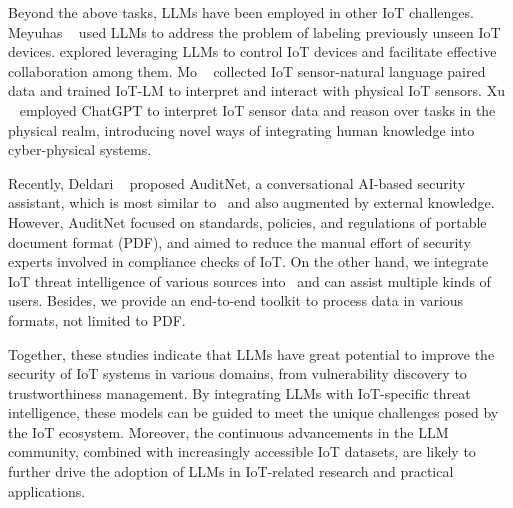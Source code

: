 Beyond the above tasks, LLMs have been employed in other IoT challenges.
Meyuhas \etal~\cite{meyuhas2024iotlabel} used LLMs to address the problem of labeling previously unseen IoT devices.
\cite{llmiotcontrol,cui2024llmind} explored leveraging LLMs to control IoT devices and facilitate effective collaboration among them.
Mo \etal~\cite{mo2024iot} collected IoT sensor-natural language paired data and trained IoT-LM to interpret and interact with physical IoT sensors.
Xu \etal~\cite{xu2024penetrative} employed ChatGPT to interpret IoT sensor data and reason over tasks in the physical realm, introducing novel ways of integrating human knowledge into cyber-physical systems. 

Recently, Deldari \etal~\cite{deldari2024auditnet} proposed AuditNet, a conversational AI-based security assistant, which is most similar to \chatiot\ and also augmented by external knowledge.
However, AuditNet focused on standards, policies, and regulations of portable document format (PDF), and aimed to reduce the manual effort of security experts involved in compliance checks of IoT. 
On the other hand, we integrate IoT threat intelligence of various sources into \chatiot\ and can assist multiple kinds of users. Besides, we provide an end-to-end toolkit to process data in various formats, not limited to PDF. 

Together, these studies indicate that LLMs have great potential to improve the security of IoT systems in various domains, from vulnerability discovery to trustworthiness management. 
By integrating LLMs with IoT-specific threat intelligence, these models can be guided to meet the unique challenges posed by the IoT ecosystem.
Moreover, the continuous advancements in the LLM community, combined with increasingly accessible IoT datasets, are likely to further drive the adoption of LLMs in IoT-related research and practical applications.
